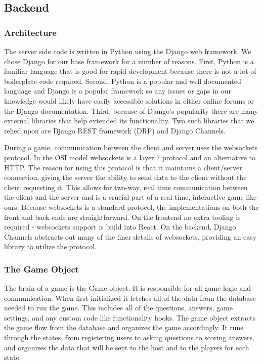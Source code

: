 \documentclass{article}
\begin{document}
	\subsection{Backend}
        \subsubsection{Architecture}
    	    The server side code is written in Python using the Django web framework. We chose Django for our base framework for a number of reasons. First, Python is a familiar language that is good for rapid development because there is not a lot of boilerplate code required. Second, Python is a popular and well documented language and Django is a popular framework so any issues or gaps in our knowledge would likely have easily accessible solutions in either online forums or the Django documentation. Third, because of Django's popularity there are many external libraries that help extended its functionality. Two such libraries that we relied upon are Django REST framework (DRF) and Django Channels.
    	    \smallskip

            During a game, communication between the client and server uses the websockets protocol. In the OSI model websockets is a layer 7 protocol and an alternative to HTTP. The reason for using this protocol is that it maintains a client/server connection, giving the server the ability to send data to the client without the client requesting it. This allows for two-way, real time communication between the client and the server and is a crucial part of a real time, interactive game like ours. Because websockets is a standard protocol, the implementations on both the front and back ends are straightforward. On the frontend no extra tooling is required - websockets support is build into React. On the backend, Django Channels abstracts out many of the finer details of websockets, providing an easy library to  utilize the protocol.
        
        \subsubsection{The Game Object}\label{game-object}
            The brain of a game is the Game object. It is responsible for all game logic and communication. When first initialized it fetches all of the data from the database needed to run the game. This includes all of the questions, answers, game settings, and any custom code like functionality hooks. The game object extracts the game flow from the database and organizes the game accordingly. It runs through the states, from registering users to asking questions to scoring answers, and organizes the data that will be sent to the host and to the players for each state.
            \smallskip
            
\end{document}
